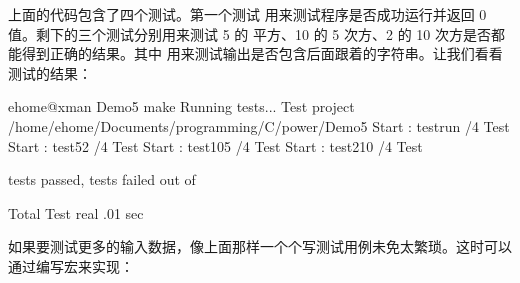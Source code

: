 \documentclass[a4paper,12pt,english]{sphinxmanual}
\begin{document}
\sphinxAtStartPar
上面的代码包含了四个测试。第一个测试  用来测试程序是否成功运行并返回 0 值。剩下的三个测试分别用来测试 5 的 平方、10 的 5 次方、2 的 10 次方是否都能得到正确的结果。其中  用来测试输出是否包含后面跟着的字符串。让我们看看测试的结果：

\begin{sphinxVerbatim}[commandchars=\\\{\}]
\PYG{o}{[}ehome@xman Demo5\PYG{o}{]}\PYGZdl{} make 
Running tests...
Test project /home/ehome/Documents/programming/C/power/Demo5
    Start : test\PYGZus{}run
/4 Test 
    Start : test\PYGZus{}5\PYGZus{}2
/4 Test 
    Start : test\PYGZus{}10\PYGZus{}5
/4 Test 
    Start : test\PYGZus{}2\PYGZus{}10
/4 Test 

\PYGZpc{} tests passed,  tests failed out of 

Total Test  real    .01 sec
\end{sphinxVerbatim}

\sphinxAtStartPar
如果要测试更多的输入数据，像上面那样一个个写测试用例未免太繁琐。这时可以通过编写宏来实现：
\end{document}

